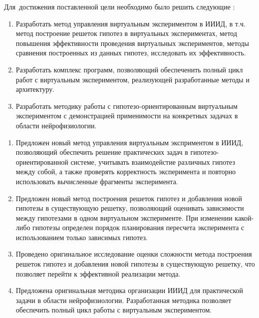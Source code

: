 Для~достижения поставленной цели необходимо было решить следующие {\tasks}:
\begin{enumerate}[beginpenalty=10000] %
    \item Разработать метод управления виртуальным экспериментом в ИИИД, в т.ч. метод построение решеток 
            гипотез в виртуальных экспериментах, метод повышения эффективности проведения виртуальных 
            экспериментов, методы сравнения построенных из данных гипотез, исследовать их эффективность.
    \item Разработать комплекс программ, позволяющий обеспеченить полный цикл работ с виртуальным экспериментом, 
            реализующей разработанные методы и архитектуру.
    \item Разработать методику работы с гипотезо-ориентированным виртуальным экспериментом с демонстрацией 
            применимости на конкретных задачах в области нейрофизиологии.
\end{enumerate}


{\novelty}
\begin{enumerate}[beginpenalty=10000] %
  \item Предложен новый метод управления виртуальным эксприментом в ИИИД, позволяющий 
        обеспечить решение практических задач в гипотезо-ориентированной системе, учитывать взаимодейстие различных 
        гипотез между собой, а также проверять корректность эксперимента и повторно использовать вычисленные фрагменты
        эксперимента. 
  \item Предложен новый метод построения решеток гипотез и добавления новой гипотезы в существующую решетку, 
        позволяющий оценивать зависимости между гипотезами в одном виртуальном эксперименте.	
        При изменении какой-либо гипотезы определен порядок планирования пересчета эксперимента с использованием 
        только зависимых гипотез. 
  \item Проведено оригинальное исследование оценки сложности метода построения решеток гипотез и 
        добавления новой гипотезы в существующую решетку, что позволяет перейти к эффективной реализации метода.
  \item Предложена оригинальная методика организации ИИИД для практической задачи в области нейрофизиологии. 
        Разработанная методика позволяет обеспечить полный цикл работы с виртуальным экспериментом.
\end{enumerate}

